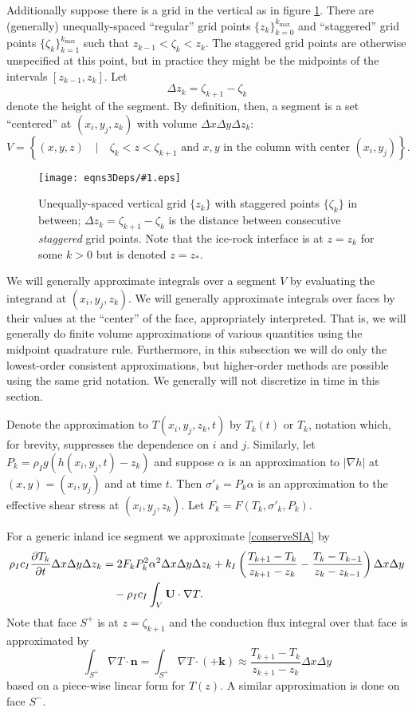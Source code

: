\documentclass[12pt,final]{amsart}%
\theoremstyle{plain}
\theoremstyle{definition}
\theoremstyle{remark}
\newcommand{\regfigure}[2]{\texttt{[image: eqns3Deps/\#1.eps]}}
\newcommand{\ddt}[1]{\ensuremath{\frac{\partial #1}{\partial t}}}
\newcommand{\grad}{\nabla}
\newcommand{\khat}{\mathbf{k}}
\newcommand{\nhat}{\mathbf{n}}
\newcommand{\bU}{{\mathbf{U}}}
\begin{document}
Additionally suppose there is a grid in the vertical as in figure \ref{fig:verticalgrid}.  There are (generally) unequally-spaced ``regular'' grid points $\{z_k\}_{k=0}^{k_{\max}}$ and ``staggered'' grid points $\{\zeta_k\}_{k=1}^{k_{\max}}$ such that $z_{k-1} < \zeta_k < z_k$.  The staggered grid points are otherwise unspecified at this point, but in practice they might be the midpoints of the intervals $[z_{k-1},z_k]$.  Let
    $$\Delta z_k = \zeta_{k+1} - \zeta_k$$
denote the height of the segment.  By definition, then, a segment is a set ``centered'' at $(x_i,y_j, z_k)$ with volume $\Delta x \Delta y \Delta z_k$:
    $$V = \left\{(x,y,z) \quad\big|\quad \zeta_k < z < \zeta_{k+1} \text{ and } x, y \text{ in the column with center } (x_i,y_j) \right\}.$$

\begin{figure}[ht]
\vspace{0.2in}
\regfigure{verticalgrid}{4.0}
\vspace{0.2in}
\caption{Unequally-spaced vertical grid $\{z_k\}$ with staggered points $\{\zeta_k\}$ in between; $\Delta z_k= \zeta_{k+1} - \zeta_k$ is the distance between consecutive \emph{staggered} grid points.  Note that the ice-rock interface is at $z=z_k$ for some $k>0$ but is denoted $z=z_\ast$.}
\label{fig:verticalgrid}
\end{figure}

We will generally approximate integrals over a segment $V$ by evaluating the integrand at $(x_i,y_j, z_k)$.  We will generally approximate integrals over faces by their values at the ``center'' of the face, appropriately interpreted.  That is, we will generally do finite volume approximations of various quantities using the midpoint quadrature rule.  Furthermore, in this subsection we will do only the lowest-order consistent approximations, but higher-order methods are possible using the same grid notation.  We generally will not discretize in time in this section.

Denote the approximation to $T(x_i,y_j,z_k,t)$ by $T_k(t)$ or $T_k$, notation which, for brevity, suppresses the dependence on $i$ and $j$.  Similarly, let $P_k = \rho_I g (h(x_i,y_j,t)-z_k)$ and suppose $\alpha$ is an approximation to $|\grad h|$ at $(x,y)=(x_i,y_j)$ and at time $t$.   Then $\sigma'_k = P_k \alpha$ is an approximation to the effective shear stress at $(x_i,y_j,z_k)$.  Let $F_k = F(T_k,\sigma'_k,P_k)$.

For a generic inland ice segment we approximate \eqref{conserveSIA} by
\begin{align}
\rho_I c_I \ddt{T_k} \Delta x \Delta y \Delta z_k &= 2 F_k P_k^2 \alpha^2 \Delta x \Delta y \Delta z_k + k_I \left(\frac{T_{k+1}-T_k}{z_{k+1}-z_k} - \frac{T_k-T_{k-1}}{z_k-z_{k-1}}\right) \Delta x \Delta y \label{conserveSIAfd} \\
    &\quad - \rho_I c_I \int_V \bU \cdot \grad T. \notag
\end{align}
Note that face $S^+$ is at $z=\zeta_{k+1}$ and the conduction flux integral over that face is approximated by
    $$\int_{S^+} \grad T\cdot \nhat = \int_{S^+} \grad T\cdot(+\khat) \approx \frac{T_{k+1}-T_k}{z_{k+1}-z_k} \Delta x \Delta y$$
based on a piece-wise linear form for $T(z)$.  A similar approximation is done on face $S^-$.
\end{document}
